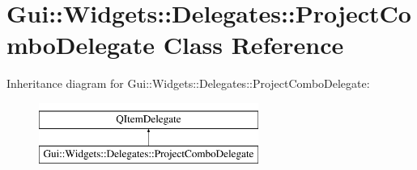 \hypertarget{classGui_1_1Widgets_1_1Delegates_1_1ProjectComboDelegate}{\section{Gui\+:\+:Widgets\+:\+:Delegates\+:\+:Project\+Combo\+Delegate Class Reference}
\label{classGui_1_1Widgets_1_1Delegates_1_1ProjectComboDelegate}
}
Inheritance diagram for Gui\+:\+:Widgets\+:\+:Delegates\+:\+:Project\+Combo\+Delegate\+:\begin{figure}[H]
\begin{center}
\leavevmode
\includegraphics[height=2.000000cm]{d6/d93/classGui_1_1Widgets_1_1Delegates_1_1ProjectComboDelegate}
\end{center}
\end{figure}
